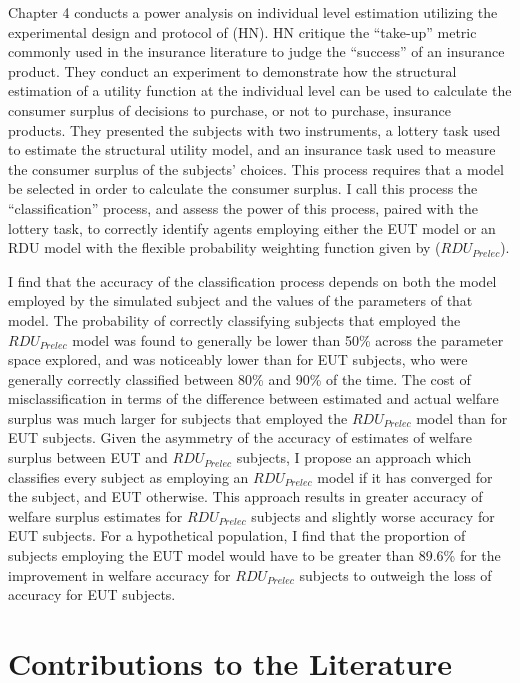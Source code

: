 \documentclass[../main.tex]{subfiles}
\begin{document}
Chapter 4 conducts a power analysis on individual level estimation utilizing the experimental design and protocol of \textcite{Harrison2016} (HN).
HN critique the \enquote{take-up} metric commonly used in the insurance literature to judge the \enquote{success} of an insurance product.
They conduct an experiment to demonstrate how the structural estimation of a utility function at the individual level can be used to calculate the consumer surplus of decisions to purchase, or not to purchase, insurance products.
They presented the subjects with two instruments, a lottery task used to estimate the structural utility model, and an insurance task used to measure the consumer surplus of the subjects' choices.
This process requires that a model be selected in order to calculate the consumer surplus.
I call this process the \enquote{classification} process, and assess the power of this process, paired with the lottery task, to correctly identify agents employing either the EUT model or an RDU model with the flexible probability weighting function given by \textcite{Prelec1998} ($\mathit{RDU_{Prelec}}$).

I find that the accuracy of the classification process depends on both the model employed by the simulated subject and the values of the parameters of that model.
The probability of correctly classifying subjects that employed the $\mathit{RDU_{Prelec}}$ model was found to generally be lower than 50\% across the parameter space explored, and was noticeably lower than for EUT subjects, who were generally correctly classified between 80\% and 90\% of the time.
The cost of misclassification in terms of the difference between estimated and actual welfare surplus was much larger for subjects that employed the $\mathit{RDU_{Prelec}}$ model than for EUT subjects.
Given the asymmetry of the accuracy of estimates of welfare surplus between EUT and $\mathit{RDU_{Prelec}}$ subjects, I propose an approach which classifies every subject as employing an $\mathit{RDU_{Prelec}}$ model if it has converged for the subject, and EUT otherwise.
This approach results in greater accuracy of welfare surplus estimates for $\mathit{RDU_{Prelec}}$ subjects and slightly worse accuracy for EUT subjects.
For a hypothetical population, I find that the proportion of subjects employing the EUT model would have to be greater than 89.6\% for the improvement in welfare accuracy for $\mathit{RDU_{Prelec}}$ subjects to outweigh the loss of accuracy for EUT subjects.

\section{Contributions to the Literature}
\end{document}
